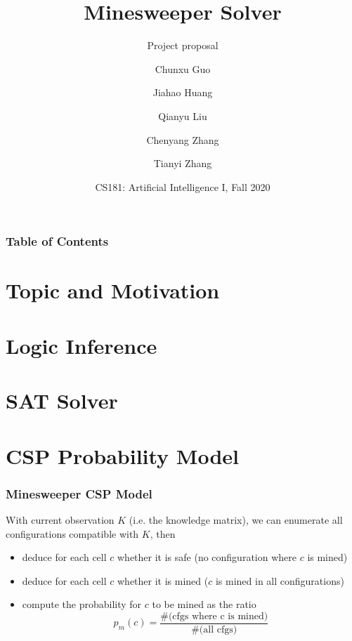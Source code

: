 \documentclass[aspectratio=169]{beamer}
\title[Minesweeper Solver] %
{Minesweeper Solver}
\subtitle{Project proposal}
\author[Team 4] %
{Chunxu Guo \and Jiahao Huang \and Qianyu Liu\\ \and Chenyang Zhang \and Tianyi Zhang}
\institute[ShanghaiTech] %
{
  ShanghaiTech University
}
\date[Dec. 14] %
{CS181: Artificial Intelligence I, Fall 2020}
\begin{document}
\frame{\titlepage}


\begin{frame}
\frametitle{Table of Contents}
\tableofcontents
\end{frame}


\section{Topic and Motivation}






\section{Logic Inference}






\section{SAT Solver}






\section{CSP Probability Model}

\begin{frame}
	\frametitle{Minesweeper CSP Model}
	With current observation $K$ (i.e. the knowledge matrix), we can enumerate all configurations compatible with $K$, then
	\begin{itemize}
		\item deduce for each cell $c$ whether it is safe (no configuration where $c$ is mined)
		\item deduce for each cell $c$ whether it is mined ($c$ is mined in all configurations)
		\item compute the probability for $c$ to be mined as the ratio $$ p_m(c) = \frac{\mbox{\# (cfgs where c is mined)}}{\mbox{\# (all cfgs)}} $$

	\end{itemize}
\end{frame}
\end{document}
